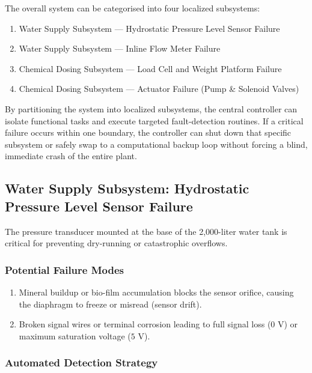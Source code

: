 \documentclass[12pt,a4paper]{article}
\begin{document}
The overall system can be categorised into four localized subsystems:

\begin{enumerate}
    \item Water Supply Subsystem --- Hydrostatic Pressure Level Sensor Failure
    \item Water Supply Subsystem --- Inline Flow Meter Failure
    \item Chemical Dosing Subsystem --- Load Cell and Weight Platform Failure
    \item Chemical Dosing Subsystem --- Actuator Failure (Pump \& Solenoid Valves)
\end{enumerate}

By partitioning the system into localized subsystems, the central controller can isolate functional tasks and execute targeted fault-detection routines. If a critical failure occurs within one boundary, the controller can shut down that specific subsystem or safely swap to a computational backup loop without forcing a blind, immediate crash of the entire plant.

\subsection{Water Supply Subsystem: Hydrostatic Pressure Level Sensor Failure}

The pressure transducer mounted at the base of the 2,000-liter water tank is critical for preventing dry-running or catastrophic overflows.

\subsubsection*{Potential Failure Modes}

\begin{enumerate}
    \item Mineral buildup or bio-film accumulation blocks the sensor orifice, causing the diaphragm to freeze or misread (sensor drift).
    \item Broken signal wires or terminal corrosion leading to full signal loss ($0\text{ V}$) or maximum saturation voltage ($5\text{ V}$).
\end{enumerate}

\subsubsection*{Automated Detection Strategy}
\end{document}

